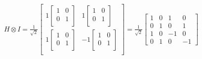 \documentclass{iansnotes}
\begin{document}
\noindent $H \otimes I = \frac{1}{\sqrt{2}} \begin{bmatrix}
  1 \begin{bmatrix} 1 & 0 \\ 0 & 1 \\ \end{bmatrix} & 1 \begin{bmatrix} 1 & 0 \\ 0 & 1 \\ \end{bmatrix} \\[5mm]
  1 \begin{bmatrix} 1 & 0 \\ 0 & 1 \\ \end{bmatrix} & -1 \begin{bmatrix} 1 & 0 \\ 0 & 1 \\ \end{bmatrix} \\
\end{bmatrix} = \frac{1}{\sqrt{2}} \begin{bmatrix} 1 & 0 & 1 & 0 \\ 0 & 1 & 0 & 1 \\ 1 & 0 & -1 & 0 \\ 0 & 1 & 0 & -1 \end{bmatrix}$
\end{document}
